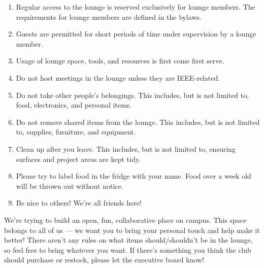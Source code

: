 \documentclass[11pt,a4paper]{article}
\begin{document}
\begin{enumerate}
    \item{Regular access to the lounge is reserved exclusively for lounge members. The requirements for lounge members are defined in the bylaws.}
    \item{Guests are permitted for short periods of time under supervision by a lounge member.}
    \item{Usage of lounge space, tools, and resources is first come first serve.}
    \item{Do not host meetings in the lounge unless they are IEEE-related.}
    \item{Do not take other people's belongings. This includes, but is not limited to, food, electronics, and personal items.}
    \item{Do not remove shared items from the lounge. This includes, but is not limited to, supplies, furniture, and equipment.}
    \item{Clean up after you leave. This includes, but is not limited to, ensuring surfaces and project areas are kept tidy.}
    \item{Please try to label food in the fridge with your name. Food over a week old will be thrown out without notice.}
    \item{Be nice to others! We're all friends here!}
\end{enumerate}

\noindent We're trying to build an open, fun, collaborative place on campus. This space belongs to all of us — we want you to bring your personal touch and help make it better! There aren't any rules on what items should/shouldn't be in the lounge, so feel free to bring whatever you want. If there's something you think the club should purchase or restock, please let the executive board know!

\newpage
\end{document}
